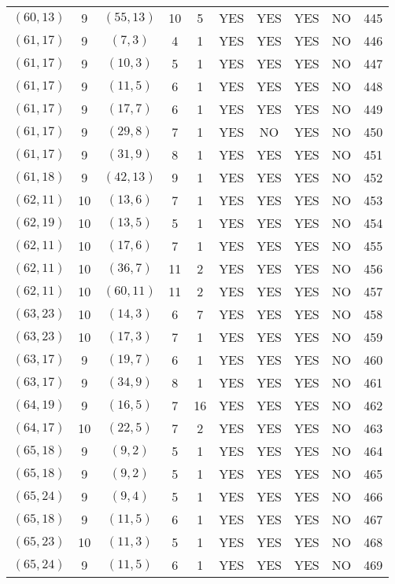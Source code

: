 \begin{longtable}{|c|c|c|c|c|c|c|c|c|c|}
$(60, 13)$ & 9 & $(55, 13)$ & 10 & 5 & YES & YES & YES & NO & 445\\
$(61, 17)$ & 9 & $(7, 3)$ & 4 & 1 & YES & YES & YES & NO & 446\\
$(61, 17)$ & 9 & $(10, 3)$ & 5 & 1 & YES & YES & YES & NO & 447\\
$(61, 17)$ & 9 & $(11, 5)$ & 6 & 1 & YES & YES & YES & NO & 448\\
$(61, 17)$ & 9 & $(17, 7)$ & 6 & 1 & YES & YES & YES & NO & 449\\
$(61, 17)$ & 9 & $(29, 8)$ & 7 & 1 & YES & NO & YES & NO & 450\\
$(61, 17)$ & 9 & $(31, 9)$ & 8 & 1 & YES & YES & YES & NO & 451\\
$(61, 18)$ & 9 & $(42, 13)$ & 9 & 1 & YES & YES & YES & NO & 452\\
$(62, 11)$ & 10 & $(13, 6)$ & 7 & 1 & YES & YES & YES & NO & 453\\
$(62, 19)$ & 10 & $(13, 5)$ & 5 & 1 & YES & YES & YES & NO & 454\\
$(62, 11)$ & 10 & $(17, 6)$ & 7 & 1 & YES & YES & YES & NO & 455\\
$(62, 11)$ & 10 & $(36, 7)$ & 11 & 2 & YES & YES & YES & NO & 456\\
$(62, 11)$ & 10 & $(60, 11)$ & 11 & 2 & YES & YES & YES & NO & 457\\
$(63, 23)$ & 10 & $(14, 3)$ & 6 & 7 & YES & YES & YES & NO & 458\\
$(63, 23)$ & 10 & $(17, 3)$ & 7 & 1 & YES & YES & YES & NO & 459\\
$(63, 17)$ & 9 & $(19, 7)$ & 6 & 1 & YES & YES & YES & NO & 460\\
$(63, 17)$ & 9 & $(34, 9)$ & 8 & 1 & YES & YES & YES & NO & 461\\
$(64, 19)$ & 9 & $(16, 5)$ & 7 & 16 & YES & YES & YES & NO & 462\\
$(64, 17)$ & 10 & $(22, 5)$ & 7 & 2 & YES & YES & YES & NO & 463\\
$(65, 18)$ & 9 & $(9, 2)$ & 5 & 1 & YES & YES & YES & NO & 464\\
$(65, 18)$ & 9 & $(9, 2)$ & 5 & 1 & YES & YES & YES & NO & 465\\
$(65, 24)$ & 9 & $(9, 4)$ & 5 & 1 & YES & YES & YES & NO & 466\\
$(65, 18)$ & 9 & $(11, 5)$ & 6 & 1 & YES & YES & YES & NO & 467\\
$(65, 23)$ & 10 & $(11, 3)$ & 5 & 1 & YES & YES & YES & NO & 468\\
$(65, 24)$ & 9 & $(11, 5)$ & 6 & 1 & YES & YES & YES & NO & 469\\

\end{longtable}
